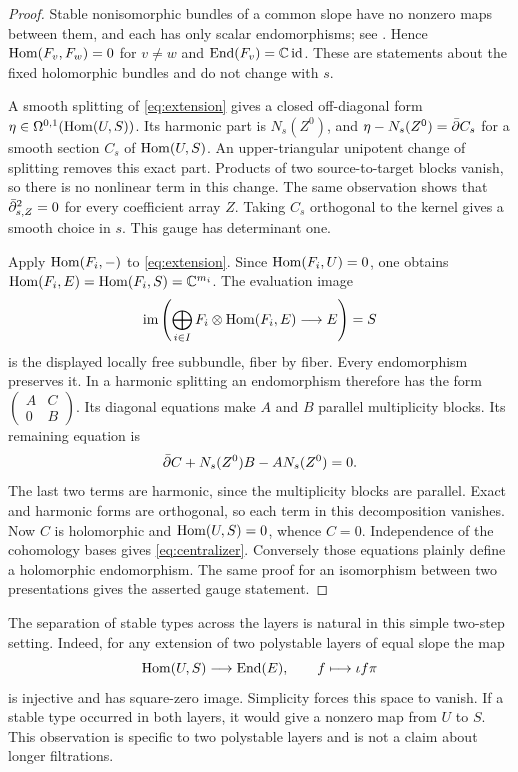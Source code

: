 \begin{proof}
Stable nonisomorphic bundles of a common slope have no nonzero maps
between them, and each has only scalar endomorphisms; see
\cite[Chapter~V, \S7]{kobayashi1987}. Hence
$\operatorname{Hom}(F_v,F_w)=0$ for $v\ne w$ and
$\operatorname{End}(F_v)=\mathbb C\operatorname{id}$. These are statements about the fixed holomorphic
bundles and do not change with $s$.

A smooth splitting of \eqref{eq:extension} gives a closed off-diagonal
form $\eta\in\Omega^{0,1}(\operatorname{Hom}(U,S))$. Its harmonic part is
$N_s(Z^0)$, and $\eta-N_s(Z^0)=\bar\partial C_s$ for a smooth section
$C_s$ of $\operatorname{Hom}(U,S)$. An upper-triangular unipotent change of splitting
removes this exact part. Products of two source-to-target blocks vanish,
so there is no nonlinear term in this change. The same observation shows
that $\bar\partial_{s,Z}^2=0$ for every coefficient array $Z$. Taking $C_s$
orthogonal to the kernel gives a smooth choice in $s$. This gauge has
determinant one.

Apply $\operatorname{Hom}(F_i,-)$ to \eqref{eq:extension}. Since
$\operatorname{Hom}(F_i,U)=0$, one obtains
$\operatorname{Hom}(F_i,E)=\operatorname{Hom}(F_i,S)=\mathbb C^{m_i}$. The evaluation image
\[
\operatorname{im}\left(\bigoplus_{i\in I}
F_i\otimes\operatorname{Hom}(F_i,E)\longrightarrow E\right)=S
\]
is the displayed locally free subbundle, fiber by fiber. Every
endomorphism preserves it. In a harmonic splitting an endomorphism
therefore has the form $\left(\begin{smallmatrix}A&C\\0&B\end{smallmatrix}\right)$.
Its diagonal equations make $A$ and $B$ parallel multiplicity blocks.
Its remaining equation is
\begin{equation}\label{eq:exact-harmonic}
\bar\partial C+N_s(Z^0)B-AN_s(Z^0)=0.
\end{equation}
The last two terms are harmonic, since the multiplicity blocks are
parallel. Exact and harmonic forms are orthogonal, so each term in this
decomposition vanishes. Now $C$ is holomorphic and
$\operatorname{Hom}(U,S)=0$, whence $C=0$. Independence of the cohomology bases gives
\eqref{eq:centralizer}. Conversely those equations plainly define a
holomorphic endomorphism. The same proof for an isomorphism between two
presentations gives the asserted gauge statement.
\end{proof}

The separation of stable types across the layers is natural in this
simple two-step setting. Indeed, for any extension of two polystable
layers of equal slope the map
\[
\operatorname{Hom}(U,S)\longrightarrow\operatorname{End}(E),\qquad f\longmapsto\iota f\pi
\]
is injective and has square-zero image. Simplicity forces this space to
vanish. If a stable type occurred in both layers, it would give a nonzero
map from $U$ to $S$. This observation is specific to two polystable
layers and is not a claim about longer filtrations.

